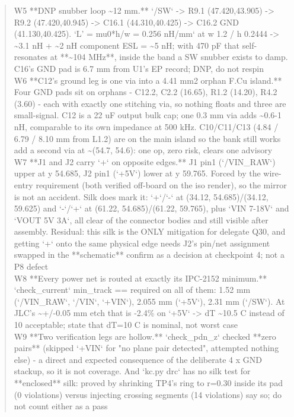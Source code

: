 \documentclass[11pt,a4paper]{article}
\begin{document}
\begin{quote}
\textbar{} W5 \textbar{} {*}{*}DNP snubber loop \textasciitilde{}12 mm.{*}{*} `/SW` -\textgreater{} R9.1 (47.420,43.905) -\textgreater{} R9.2 (47.420,40.945) -\textgreater{} C16.1 (44.310,40.425) -\textgreater{} C16.2 GND (41.130,40.425). `L' = mu0{*}h/w = 0.256 nH/mm` at w 1.2 / h 0.2444 -\textgreater{} \textasciitilde{}3.1 nH + \textasciitilde{}2 nH component ESL = \textasciitilde{}5 nH; with 470 pF that self-resonates at {*}{*}\textasciitilde{}104 MHz{*}{*}, inside the band a SW snubber exists to damp. C16's GND pad is 6.7 mm from U1's EP \textbar{} record; DNP, do not respin \textbar{}\\
\textbar{} W6 \textbar{} {*}{*}C12's ground leg is one via into a 4.41 mm2 orphan F.Cu island.{*}{*} Four GND pads sit on orphans - C12.2, C2.2 (16.65), R1.2 (14.20), R4.2 (3.60) - each with exactly one stitching via, so nothing floats and three are small-signal. C12 is a 22 uF output bulk cap; one 0.3 mm via adds \textasciitilde{}0.6-1 nH, comparable to its own impedance at 500 kHz. C10/C11/C13 (4.84 / 6.79 / 8.10 mm from L1.2) are on the main island so the bank still works \textbar{} add a second via at \textasciitilde{}(54.7, 54.6): one op, zero risk, clears one advisory \textbar{}\\
\textbar{} W7 \textbar{} {*}{*}J1 and J2 carry `+` on opposite edges.{*}{*} J1 pin1 (`/VIN\_RAW`) upper at y 54.685, J2 pin1 (`+5V`) lower at y 59.765. Forced by the wire-entry requirement (both verified off-board on the iso render), so the mirror is not an accident. Silk does mark it: `+`/`-` at (34.12, 54.685)/(34.12, 59.625) and `-`/`+` at (61.22, 54.685)/(61.22, 59.765), plus `VIN 7-18V` and `VOUT 5V 3A`, all clear of the connector bodies and still visible after assembly. Residual: this silk is the ONLY mitigation for delegate Q30, and getting `+` onto the same physical edge needs J2's pin/net assignment swapped in the {*}{*}schematic{*}{*} \textbar{} confirm as a decision at checkpoint 4; not a P8 defect \textbar{}\\
\textbar{} W8 \textbar{} {*}{*}Every power net is routed at exactly its IPC-2152 minimum.{*}{*} `check\_current` min\_track == required on all of them: 1.52 mm (`/VIN\_RAW`, `/VIN`, `+VIN`), 2.055 mm (`+5V`), 2.31 mm (`/SW`). At JLC's \textasciitilde{}+/-0.05 mm etch that is -2.4\% on `+5V` -\textgreater{} dT \textasciitilde{}10.5 C instead of 10 \textbar{} acceptable; state that dT=10 C is nominal, not worst case \textbar{}\\
\textbar{} W9 \textbar{} {*}{*}Two verification legs are hollow.{*}{*} `check\_pdn\_z` checked {*}{*}zero pairs{*}{*} (skipped `+VIN` for "no plane pair detected", attempted nothing else) - a direct and expected consequence of the deliberate 4 x GND stackup, so it is not coverage. And `kc.py drc` has no silk test for {*}{*}enclosed{*}{*} silk: proved by shrinking TP4's ring to r=0.30 inside its pad (0 violations) versus injecting crossing segments (14 violations) \textbar{} say so; do not count either as a pass \textbar{}\\

\end{quote}
\end{document}
